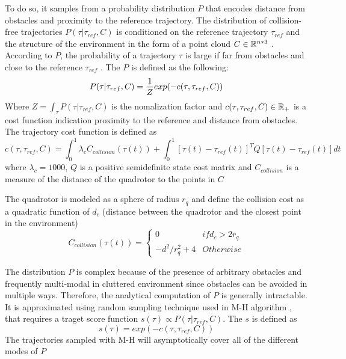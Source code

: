 To do so, it samples from a probability distribution $P$ that encodes distance from obstacles and proximity to the reference trajectory. The distribution of collision-free trajectories $P(\tau | \tau_{ref}, C)$ is
conditioned on the reference trajectory $\tau_{ref}$ and the structure of the
environment in the form of a point cloud $C \in \mathbb{R}^{n*3}$ . According to $P$,
the probability of a trajectory $\tau$ is large if far from obstacles and close
to the reference $\tau_{ref}$ . The $P$ is defined as the following:
\begin{equation}
	P(\tau | \tau_{ref},C) = \frac{1}{Z} exp(-c(\tau, \tau_{ref},C)) \\
\end{equation}
Where $	Z = \int_{\tau} P(\tau | \tau_{ref},C)$ is the nomalization factor and $c(\tau, \tau_{ref},C) \in \mathbb{R}_+$ is a cost function indication proximity to the reference and distance from obstacles. The trajectory cost function is defined as 
\begin{equation}
	c(\tau, \tau_{ref},C) = \int_0^1 \lambda_c C_{collision}(\tau(t)) + \int_0^1 [\tau(t)-\tau_{ref}(t)]^T Q[\tau(t)-\tau_{ref}(t)]{dt}
	\label{eqn:collision}
\end{equation}
where $\lambda_c = 1000$, $Q$ is a positive semidefinite state cost matrix and $C_{collision}$ is a measure of the distance of the quadrotor to the points in $C$

The quadrotor is modeled as a sphere of radius $r_q$ and define the collision cost as a quadratic function of $d_c$ (distance between the quadrotor and the closest point in the environment)
\begin{equation}
	C_{collision}(\tau(t)) = 
	\begin{cases}
		0 & if d_c > 2r_q \\
		-d^2/r_q^2 + 4 & Otherwise
	\end{cases}
\end{equation}

The distribution $P$ is complex because of the presence of arbitrary obstacles and frequently multi-modal in cluttered environment since obstacles can be avoided in multiple ways. Therefore, the analytical computation of $P$ is generally intractable. It is approximated using random sampling technique used in M-H algorithm \cite{MH_hasting}, that requires a traget score function $s(\tau) \propto P(\tau | \tau_{ref},C)$. The $s$ is defined as 
\begin{equation}
	s(\tau) = exp(-c(\tau, \tau_{ref},C))
\end{equation}
The trajectories sampled with M-H will asymptotically cover all of the different modes of $P$


